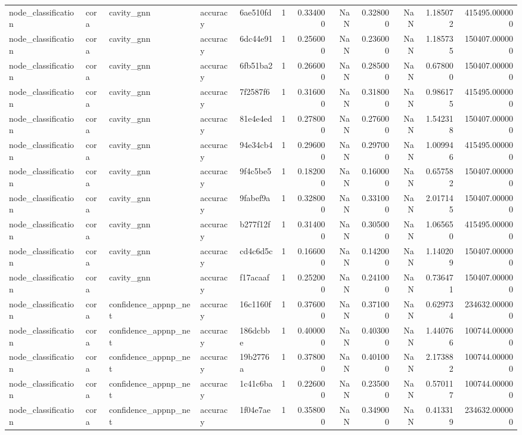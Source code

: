 \begin{tabular}{lllllrrrrrrr}
node_classification & cora & cavity_gnn & accuracy & 6ae510fd & 1 & 0.334000 & NaN & 0.328000 & NaN & 1.185072 & 415495.000000 \\
node_classification & cora & cavity_gnn & accuracy & 6dc44e91 & 1 & 0.256000 & NaN & 0.236000 & NaN & 1.185735 & 150407.000000 \\
node_classification & cora & cavity_gnn & accuracy & 6fb51ba2 & 1 & 0.266000 & NaN & 0.285000 & NaN & 0.678000 & 150407.000000 \\
node_classification & cora & cavity_gnn & accuracy & 7f2587f6 & 1 & 0.316000 & NaN & 0.318000 & NaN & 0.986175 & 415495.000000 \\
node_classification & cora & cavity_gnn & accuracy & 81e4e4ed & 1 & 0.278000 & NaN & 0.276000 & NaN & 1.542318 & 150407.000000 \\
node_classification & cora & cavity_gnn & accuracy & 94e34cb4 & 1 & 0.296000 & NaN & 0.297000 & NaN & 1.009946 & 415495.000000 \\
node_classification & cora & cavity_gnn & accuracy & 9f4c5be5 & 1 & 0.182000 & NaN & 0.160000 & NaN & 0.657582 & 150407.000000 \\
node_classification & cora & cavity_gnn & accuracy & 9fabef9a & 1 & 0.328000 & NaN & 0.331000 & NaN & 2.017145 & 150407.000000 \\
node_classification & cora & cavity_gnn & accuracy & b277f12f & 1 & 0.314000 & NaN & 0.305000 & NaN & 1.065650 & 415495.000000 \\
node_classification & cora & cavity_gnn & accuracy & cd4c6d5c & 1 & 0.166000 & NaN & 0.142000 & NaN & 1.140209 & 150407.000000 \\
node_classification & cora & cavity_gnn & accuracy & f17acaaf & 1 & 0.252000 & NaN & 0.241000 & NaN & 0.736471 & 150407.000000 \\
node_classification & cora & confidence_appnp_net & accuracy & 16c1160f & 1 & 0.376000 & NaN & 0.371000 & NaN & 0.629734 & 234632.000000 \\
node_classification & cora & confidence_appnp_net & accuracy & 186dcbbe & 1 & 0.400000 & NaN & 0.403000 & NaN & 1.440766 & 100744.000000 \\
node_classification & cora & confidence_appnp_net & accuracy & 19b2776a & 1 & 0.378000 & NaN & 0.401000 & NaN & 2.173882 & 100744.000000 \\
node_classification & cora & confidence_appnp_net & accuracy & 1c41c6ba & 1 & 0.226000 & NaN & 0.235000 & NaN & 0.570117 & 100744.000000 \\
node_classification & cora & confidence_appnp_net & accuracy & 1f04e7ae & 1 & 0.358000 & NaN & 0.349000 & NaN & 0.413319 & 234632.000000 \\

\end{tabular}
